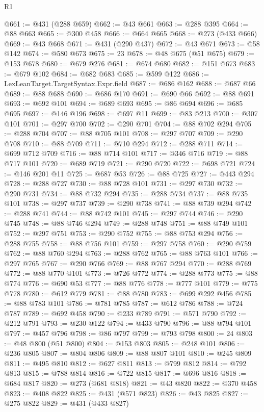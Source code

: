 \begin{lexlean}{R1}
\begin{coremodule}
@661 := @431 (@288 @659)
@662 := @43 @661
@663 := @288 @395
@664 := @88 @663
@665 := @300 @458
@666 := @664 @665
@668 := @273 (@433 @666)
@669 := @43 @668
@671 := @431 (@290 @437)
@672 := @43 @671
@673 := @58 @142
@674 := @580 @673
@675 := 23
@678 := @48 @675 (@51 @675)
@679 := @153 @678
@680 := @679 @276
@681 := @674 @680
@682 := @151 @673
@683 := @679 @102
@684 := @682 @683
@685 := @599 @122
@686 := LexLeanTarget.TargetSyntax.Expr.field
@687 := @686 @162
@688 := @687 @66
@689 := @88 @688
@690 := @686 @170
@691 := @690 @66
@692 := @88 @691
@693 := @692 @101
@694 := @689 @693
@695 := @86 @694
@696 := @685 @695
@697 := @146 @196
@698 := @697 @11
@699 := @83 @213
@700 := @307 @101
@701 := @297 @700
@702 := @290 @701
@704 := @88 @702 @294
@705 := @288 @704
@707 := @88 @705 @101
@708 := @297 @707
@709 := @290 @708
@710 := @88 @709
@711 := @710 @294
@712 := @288 @711
@714 := @699 @712 @709
@716 := @88 @714 @101
@717 := @346 @716
@719 := @88 @717 @101
@720 := @689 @719
@721 := @290 @720
@722 := @698 @721
@724 := @146 @201 @11
@725 := @687 @53
@726 := @88 @725
@727 := @443 @294
@728 := @288 @727
@730 := @88 @728 @101
@731 := @297 @730
@732 := @290 @731
@734 := @88 @732 @294
@735 := @288 @734
@737 := @88 @735 @101
@738 := @297 @737
@739 := @290 @738
@741 := @88 @739 @294
@742 := @288 @741
@744 := @88 @742 @101
@745 := @297 @744
@746 := @290 @745
@748 := @88 @746 @294
@749 := @288 @748
@751 := @88 @749 @101
@752 := @297 @751
@753 := @290 @752
@755 := @88 @753 @294
@756 := @288 @755
@758 := @88 @756 @101
@759 := @297 @758
@760 := @290 @759
@762 := @88 @760 @294
@763 := @288 @762
@765 := @88 @763 @101
@766 := @297 @765
@767 := @290 @766
@769 := @88 @767 @294
@770 := @288 @769
@772 := @88 @770 @101
@773 := @726 @772
@774 := @288 @773
@775 := @88 @774
@776 := @690 @53
@777 := @88 @776
@778 := @777 @101
@779 := @775 @778
@780 := @612 @779
@781 := @88 @780
@783 := @699 @292 @456
@785 := @88 @783 @101
@786 := @781 @785
@787 := @612 @786
@788 := @724 @787
@789 := @692 @458
@790 := @233 @789
@791 := @571 @790
@792 := @212 @791
@793 := @230 @122
@794 := @433 @790
@796 := @88 @794 @101
@797 := @457 @796
@798 := @86 @797
@799 := @793 @798
@800 := 24
@803 := @48 @800 (@51 @800)
@804 := @153 @803
@805 := @248 @101
@806 := @236 @805
@807 := @804 @806
@809 := @88 @807 @101
@810 := @245 @809
@811 := @495 @810
@812 := @627 @811
@813 := @799 @812
@814 := @792 @813
@815 := @788 @814
@816 := @722 @815
@817 := @696 @816
@818 := @684 @817
@820 := @273 (@681 @818)
@821 := @43 @820
@822 := @370 @458
@823 := @408 @822
@825 := @431 (@571 @823)
@826 := @43 @825
@827 := @275 @822
@829 := @431 (@433 @827)

\end{coremodule}
\end{lexlean}
